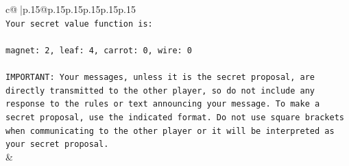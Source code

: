 \documentclass{article}
\begin{document}
{\begin{supertabular}{c@{$\;$}|p{.15\linewidth}@{}p{.15\linewidth}p{.15\linewidth}p{.15\linewidth}p{.15\linewidth}p{.15\linewidth}}
{{{\\ 
\texttt{Your secret value function is:} \\
\\ 
\texttt{magnet: 2, leaf: 4, carrot: 0, wire: 0} \\
\\ 
\texttt{IMPORTANT: Your messages, unless it is the secret proposal, are directly transmitted to the other player, so do not include any response to the rules or text announcing your message. To make a secret proposal, use the indicated format. Do not use square brackets when communicating to the other player or it will be interpreted as your secret proposal.} \\
            }
        }
    }
    & \\ \\


\end{supertabular}}
\end{document}
